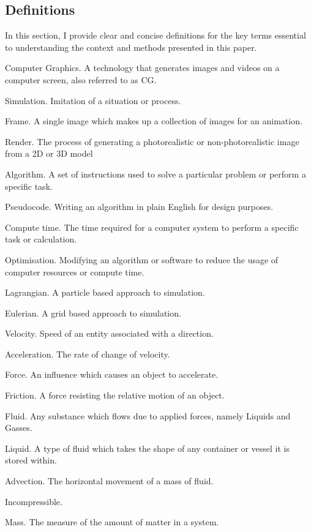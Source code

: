 \documentclass[write-up.tex]{subfiles}
\begin{document}
\subsection{Definitions}
In this section, I provide clear and concise definitions for the key terms essential to understanding the context and methods presented in this paper.
\begin{worddefs}
 \item [Computer Graphics.] A technology that generates images and videos on a computer screen, also referred to as CG.
 \item [Simulation.] Imitation of a situation or process.
 \item [Frame.] A single image which makes up a collection of images for an animation.
 \item[Render.] The process of generating a photorealistic or non-photorealistic image from a 2D or 3D model
 \item [Algorithm.] A set of instructions used to solve a particular problem or perform a specific task.
 \item [Pseudocode.] Writing an algorithm in plain English for design purposes.
 \item[Compute time.] The time required for a computer system to perform a specific task or calculation.
 \item [Optimisation.] Modifying an algorithm or software to reduce the usage of computer resources or compute time.
 \item [Lagrangian.] A particle based approach to simulation.
 \item[Eulerian.] A grid based approach to simulation.
 \item[Velocity.] Speed of an entity associated with a direction.
 \item[Acceleration.] The rate of change of velocity.
 \item[Force.] An influence which causes an object to accelerate.
 \item[Friction.] A force resisting the relative motion of an object.
 \item [Fluid.] Any substance which flows due to applied forces, namely Liquids and Gasses.
 \item [Liquid.] A type of fluid which takes the shape of any container or vessel it is stored within.
 \item[Advection.] The horizontal movement of a mass of fluid.
 \item[Incompressible.]
 \item[Mass.] The measure of the amount of matter in a system.

\end{worddefs}
\end{document}
